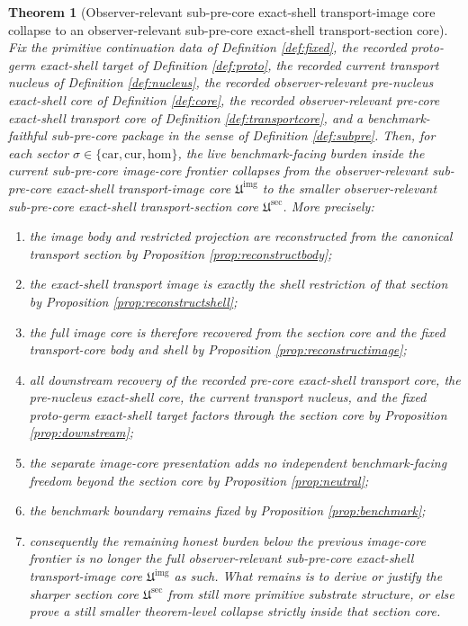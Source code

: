 \documentclass[11pt]{article}
\newcommand{\Car}{\mathrm{car}}
\newcommand{\Cur}{\mathrm{cur}}
\newcommand{\Hom}{\mathrm{hom}}
\newcommand{\SubPreImageCore}{\mathfrak U^{\mathrm{img}}}
\newcommand{\SubPreSectionCore}{\mathfrak U^{\mathrm{sec}}}
\newtheorem{theorem}{Theorem}
\begin{document}
\begin{theorem}[Observer-relevant sub-pre-core exact-shell transport-image core collapse to an observer-relevant sub-pre-core exact-shell transport-section core]
\label{thm:main}
Fix the primitive continuation data of Definition \ref{def:fixed}, the recorded proto-germ exact-shell target of Definition \ref{def:proto}, the recorded current transport nucleus of Definition \ref{def:nucleus}, the recorded observer-relevant pre-nucleus exact-shell core of Definition \ref{def:core}, the recorded observer-relevant pre-core exact-shell transport core of Definition \ref{def:transportcore}, and a benchmark-faithful sub-pre-core package in the sense of Definition \ref{def:subpre}. Then, for each sector \(\sigma\in\{\Car,\Cur,\Hom\}\), the live benchmark-facing burden inside the current sub-pre-core image-core frontier collapses from the observer-relevant sub-pre-core exact-shell transport-image core \(\SubPreImageCore\) to the smaller observer-relevant sub-pre-core exact-shell transport-section core \(\SubPreSectionCore\). More precisely:
\begin{enumerate}
    \item the image body and restricted projection are reconstructed from the canonical transport section by Proposition \ref{prop:reconstructbody};
    \item the exact-shell transport image is exactly the shell restriction of that section by Proposition \ref{prop:reconstructshell};
    \item the full image core is therefore recovered from the section core and the fixed transport-core body and shell by Proposition \ref{prop:reconstructimage};
    \item all downstream recovery of the recorded pre-core exact-shell transport core, the pre-nucleus exact-shell core, the current transport nucleus, and the fixed proto-germ exact-shell target factors through the section core by Proposition \ref{prop:downstream};
    \item the separate image-core presentation adds no independent benchmark-facing freedom beyond the section core by Proposition \ref{prop:neutral};
    \item the benchmark boundary remains fixed by Proposition \ref{prop:benchmark};
    \item consequently the remaining honest burden below the previous image-core frontier is no longer the full observer-relevant sub-pre-core exact-shell transport-image core \(\SubPreImageCore\) as such. What remains is to derive or justify the sharper section core \(\SubPreSectionCore\) from still more primitive substrate structure, or else prove a still smaller theorem-level collapse strictly inside that section core.
\end{enumerate}
\end{theorem}
\end{document}
